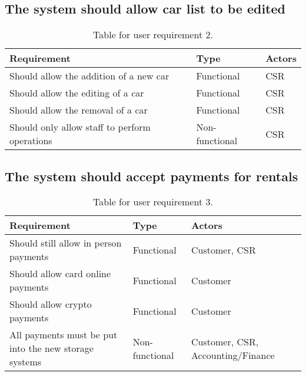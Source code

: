   \subsection{The system should allow car list to be edited}
    \begin{table}[H]
      \centering
      \begin{tabular}{|p{}|p{}|p{}|}
        \hline
        Requirement & Type & Actors \\ \hline
        Should allow the addition of a new car & Functional & CSR \\ \hline
        Should allow the editing of a car & Functional & CSR \\ \hline
        Should allow the removal of a car & Functional & CSR \\ \hline
        Should only allow staff to perform operations  & Non-functional & CSR \\ \hline
      \end{tabular}
      \caption{Table for user requirement 2.}
    \end{table}

  \subsection{The system should accept payments for rentals}
    \begin{table}[H]
      \centering
      \begin{tabular}{|p{}|p{}|p{}|}
        \hline
        Requirement & Type & Actors \\ \hline
        Should still allow in person payments & Functional & Customer, CSR \\ \hline
        Should allow card online payments & Functional & Customer \\ \hline
        Should allow crypto payments & Functional & Customer \\ \hline
        All payments must be put into the new storage systems & Non-functional & Customer, CSR, Accounting/Finance \\ \hline
      \end{tabular}
      \caption{Table for user requirement 3.}
    \end{table}

